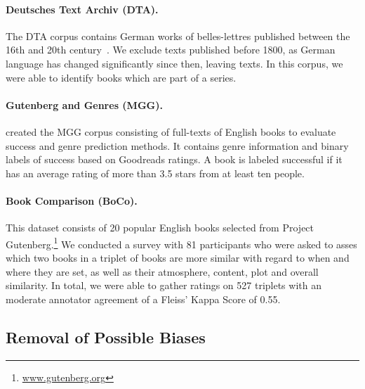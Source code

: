 \documentclass[11pt]{article}
\begin{document}
\paragraph{Deutsches Text Archiv (DTA).}
The DTA corpus contains  German works of belles-lettres published between the 16th and 20th century~\citep{berlin-brandenburgischen_akademie_der_wissenschaften_deutsches_2021}.
We exclude texts published before 1800, as German language has changed significantly since then, leaving  texts.
In this corpus, we were able to identify  books which are part of a series.

\paragraph{Gutenberg and Genres (MGG).}
\citet{maharjan_multi-task_2017} created the MGG corpus consisting of  full-texts of English books to evaluate success and genre prediction methods. 
It contains genre information and binary labels of success based on Goodreads ratings. 
A book is labeled successful if it has an average rating of more than 3.5 stars from at least ten people.

\paragraph{Book Comparison (BoCo).}
This dataset consists of 20 popular English books selected from Project Gutenberg.\footnote{\url{www.gutenberg.org}}
We conducted a survey with 81 participants who were asked to asses which two books in a triplet of books are more similar with regard to when and where they are set, as well as their atmosphere, content, plot and overall similarity. 
In total, we were able to gather ratings on 527 triplets with an moderate annotator agreement of a Fleiss' Kappa Score of 0.55.

\subsection{Removal of Possible Biases}
\end{document}
